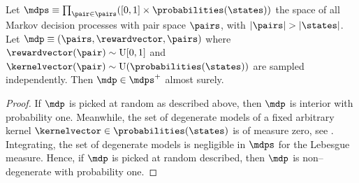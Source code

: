 \documentclass[preprint,cleveref,12pt]{colt2025}
\DeclarePairedDelimiter{\abs}{\lvert}{\rvert}	%
\def\product{\prod}
\def\model{\mdp}
\def\models{\mdps}
\def\kernel{\kernelvector}
\def\reward{\rewardvector}
\begin{document}
    \begin{corollary}
    \label{corollary_random_explorative}
        Let $\models \equiv \product_{\pair \in \pairs} ([0, 1] \times \probabilities(\states))$ the space of all Markov decision processes with pair space $\pairs$, with $\abs{\pairs} > \abs{\states}$.
        Let $\model \equiv (\pairs, \reward, \pairs)$ where $\reward(\pair) \sim \mathrm{U}[0, 1]$ and $\kernel(\pair) \sim \mathrm{U}(\probabilities(\states))$ are sampled independently. 
        Then $\model \in \models^+$ almost surely. 
    \end{corollary}
    
    \begin{proof}
        If $\model$ is picked at random as described above, then $\model$ is interior with probability one. 
        Meanwhile, the set of degenerate models of a fixed arbitrary kernel $\kernel \in \probabilities(\states)$ is of measure zero, see .
        Integrating, the set of degenerate models is negligible in $\models$ for the Lebesgue measure.
        Hence, if $\model$ is picked at random described, then $\model$ is non--degenerate with probability one. 
    \end{proof}
\end{document}
